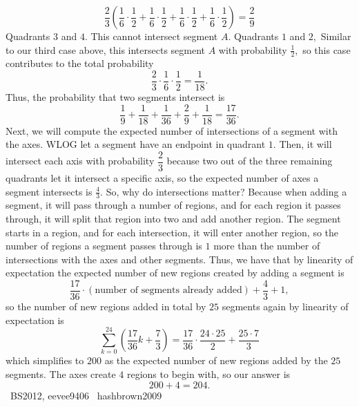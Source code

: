 \documentclass[12pt]{article}
\begin{document}
\[\dfrac{2}{3}\left(\dfrac{1}{6}\cdot\dfrac{1}{2}+\dfrac{1}{6}\cdot\dfrac{1}{2}+\dfrac{1}{6}\cdot\dfrac{1}{2}+\dfrac{1}{6}\cdot\dfrac{1}{2}\right)=\dfrac{2}{9}\] Quadrants $3$ and $4.$ This cannot intersect segment $A.$ Quadrants $1$ and $2,$ Similar to our third case above, this intersects segment $A$ with probability $\frac{1}{2},$ so this case contributes to the total probability \[\dfrac{2}{3}\cdot\dfrac{1}{6}\cdot\dfrac{1}{2}=\dfrac{1}{18}.\] Thus, the probability that two segments intersect is \[\dfrac{1}{9}+\dfrac{1}{18}+\dfrac{1}{36}+\dfrac{2}{9}+\dfrac{1}{18}=\dfrac{17}{36}.\] Next, we will compute the expected number of intersections of a segment with the axes. WLOG let a segment have an endpoint in quadrant $1.$ Then, it will intersect each axis with probability $\dfrac{2}{3}$ because two out of the three remaining quadrants let it intersect a specific axis, so the expected number of axes a segment intersects is $\frac{4}{3}.$ So, why do intersections matter? Because when adding a segment, it will pass through a number of regions, and for each region it passes through, it will split that region into two and add another region. The segment starts in a region, and for each intersection, it will enter another region, so the number of regions a segment passes through is $1$ more than the number of intersections with the axes and other segments. Thus, we have that by linearity of expectation the expected number of new regions created by adding a segment is \[\dfrac{17}{36}\cdot(\text{number of segments already added})+\dfrac{4}{3}+1,\] so the number of new regions added in total by $25$ segments again by linearity of expectation is \[\sum_{k=0}^{24}\left(\dfrac{17}{36}k+\dfrac{7}{3}\right)=\dfrac{17}{36}\cdot \dfrac{24\cdot 25}{2}+\dfrac{25\cdot 7}{3}\] which simplifies to $200$ as the expected number of new regions added by the $25$ segments. The axes create $4$ regions to begin with, so our answer is \[200+4=\boxed{204}.\] ~BS2012, eevee9406 ~hashbrown2009
\end{document}
